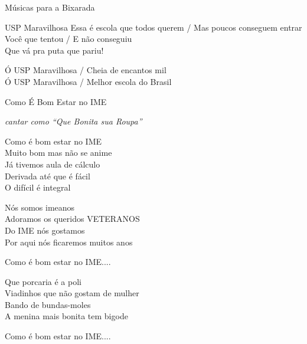 \begin{secao}{Músicas para a Bixarada}
\begin{subsecao}{USP Maravilhosa}
Essa é escola que todos querem / Mas poucos conseguem entrar \\
Você que tentou / E não conseguiu \\
Que vá pra puta que pariu!

Ó USP Maravilhosa / Cheia de encantos mil \\
Ó USP Maravilhosa / Melhor escola do Brasil
\end{subsecao}

\begin{subsecao}{Como É Bom Estar no IME}

{\em cantar como ``Que Bonita sua Roupa''}

Como é bom estar no IME \\
Muito bom mas não se anime \\
Já tivemos aula de cálculo \\
Derivada até que é fácil \\
O difícil é integral

Nós somos imeanos \\
Adoramos os queridos VETERANOS \\
Do IME nós gostamos \\
Por aqui nós ficaremos muitos anos
 
Como é bom estar no IME....

Que porcaria é a poli \\
Viadinhos que não gostam de mulher \\
Bando de bundas-moles \\
A menina mais bonita tem bigode

Como é bom estar no IME....
\\
\\
\end{subsecao}
\end{secao}
